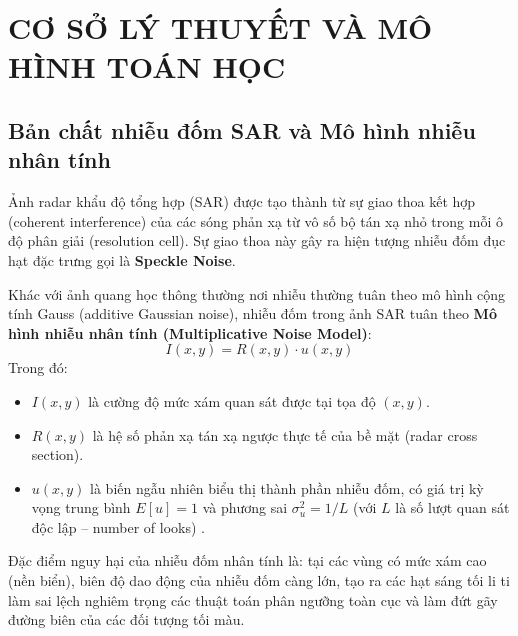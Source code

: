 \chapter{CƠ SỞ LÝ THUYẾT VÀ MÔ HÌNH TOÁN HỌC}
\label{ch:theory}

\section{Bản chất nhiễu đốm SAR và Mô hình nhiễu nhân tính}
\label{sec:speckle_noise}
Ảnh radar khẩu độ tổng hợp (SAR) được tạo thành từ sự giao thoa kết hợp (coherent interference) của các sóng phản xạ từ vô số bộ tán xạ nhỏ trong mỗi ô độ phân giải (resolution cell). Sự giao thoa này gây ra hiện tượng nhiễu đốm đục hạt đặc trưng gọi là \textbf{Speckle Noise}. 

Khác với ảnh quang học thông thường nơi nhiễu thường tuân theo mô hình cộng tính Gauss (additive Gaussian noise), nhiễu đốm trong ảnh SAR tuân theo \textbf{Mô hình nhiễu nhân tính (Multiplicative Noise Model)}:
\begin{equation}
    I(x, y) = R(x, y) \cdot u(x, y)
    \label{eq:multiplicative_noise}
\end{equation}
Trong đó:
\begin{itemize}
    \item $I(x, y)$ là cường độ mức xám quan sát được tại tọa độ $(x, y)$.
    \item $R(x, y)$ là hệ số phản xạ tán xạ ngược thực tế của bề mặt (radar cross section).
    \item $u(x, y)$ là biến ngẫu nhiên biểu thị thành phần nhiễu đốm, có giá trị kỳ vọng trung bình $E[u] = 1$ và phương sai $\sigma_u^2 = 1/L$ (với $L$ là số lượt quan sát độc lập -- number of looks) \cite{lee1980digital}.
\end{itemize}

Đặc điểm nguy hại của nhiễu đốm nhân tính là: tại các vùng có mức xám cao (nền biển), biên độ dao động của nhiễu đốm càng lớn, tạo ra các hạt sáng tối li ti làm sai lệch nghiêm trọng các thuật toán phân ngưỡng toàn cục và làm đứt gãy đường biên của các đối tượng tối màu.

